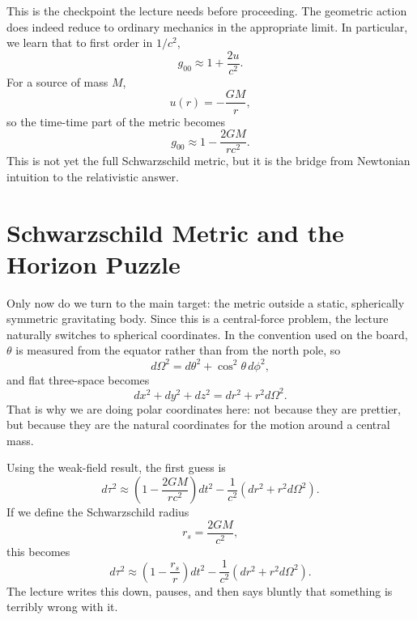 This is the checkpoint the lecture needs before proceeding. The geometric action does indeed reduce to ordinary mechanics in the appropriate limit. In particular, we learn that to first order in \(1/c^2\),
\begin{equation}
g_{00}\approx 1+\frac{2u}{c^2}.
\end{equation}
For a source of mass \(M\),
\begin{equation}
u(r)=-\frac{GM}{r},
\end{equation}
so the time-time part of the metric becomes
\begin{equation}
g_{00}\approx 1-\frac{2GM}{rc^2}.
\end{equation}
This is not yet the full Schwarzschild metric, but it is the bridge from Newtonian intuition to the relativistic answer.

\section{Schwarzschild Metric and the Horizon Puzzle}

Only now do we turn to the main target: the metric outside a static, spherically symmetric gravitating body. Since this is a central-force problem, the lecture naturally switches to spherical coordinates. In the convention used on the board, \(\theta\) is measured from the equator rather than from the north pole, so
\begin{equation}
d\Omega^2 = d\theta^2 + \cos^2\theta\,d\phi^2,
\end{equation}
and flat three-space becomes
\begin{equation}
dx^2+dy^2+dz^2 = dr^2 + r^2 d\Omega^2.
\end{equation}
That is why we are doing polar coordinates here: not because they are prettier, but because they are the natural coordinates for the motion around a central mass.

Using the weak-field result, the first guess is
\begin{equation}
d\tau^2 \approx \left(1-\frac{2GM}{rc^2}\right)dt^2
- \frac{1}{c^2}\left(dr^2+r^2d\Omega^2\right).
\end{equation}
If we define the Schwarzschild radius
\begin{equation}
r_s = \frac{2GM}{c^2},
\end{equation}
this becomes
\begin{equation}
d\tau^2 \approx \left(1-\frac{r_s}{r}\right)dt^2
- \frac{1}{c^2}\left(dr^2+r^2d\Omega^2\right).
\end{equation}
The lecture writes this down, pauses, and then says bluntly that something is terribly wrong with it.

